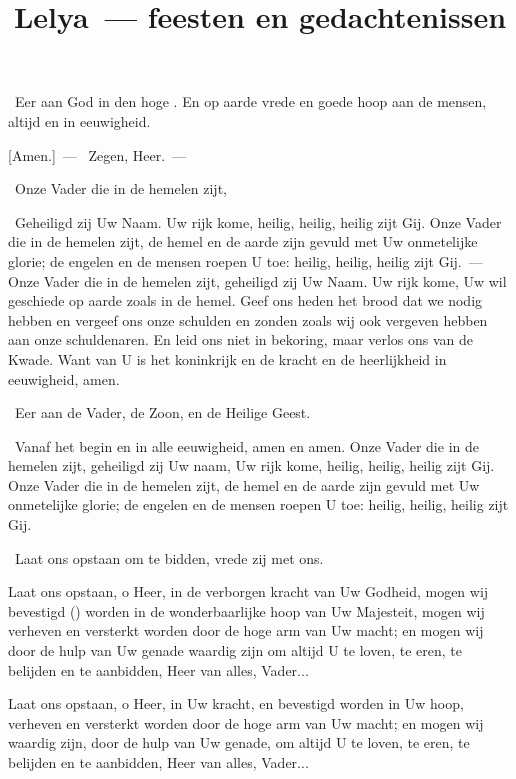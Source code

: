 \documentclass[12pt,twoside,a5paper]{article}
\begin{document}
\title{Lelya~--- feesten en gedachtenissen}
\author{}
\date{}
\maketitle

\footnotelayout{\ }


\begin{halfparskip}
  \cc~Eer aan God in den hoge . En op aarde vrede en goede hoop aan de mensen, altijd en in eeuwigheid.

  [Amen.]~--- \rr~Zegen, Heer.~--- \liturgicalhint{[Vredekus.]}

  \cc~Onze Vader die in de hemelen zijt,

  \rr~Geheiligd zij Uw Naam. Uw rijk kome, heilig, heilig, heilig zijt Gij. Onze Vader die in de hemelen zijt, de hemel en de aarde zijn gevuld met Uw onmetelijke glorie; de engelen en de mensen roepen U toe: heilig, heilig, heilig zijt Gij.~--- Onze Vader die in de hemelen zijt, geheiligd zij Uw Naam. Uw rijk kome, Uw wil geschiede op aarde zoals in de hemel. Geef ons heden het brood dat we nodig hebben en vergeef ons onze schulden en zonden zoals wij ook vergeven hebben aan onze schuldenaren. En leid ons niet in bekoring, maar verlos ons van de Kwade. Want van U is het koninkrijk en de kracht en de heerlijkheid in eeuwigheid, amen.

  \cc~Eer aan de Vader, de Zoon, en de Heilige Geest.

  \rr~Vanaf het begin en in alle eeuwigheid, amen en amen. Onze Vader die in de hemelen zijt, geheiligd zij Uw naam, Uw rijk kome, heilig, heilig, heilig zijt Gij. Onze Vader die in de hemelen zijt, de hemel en de aarde zijn gevuld met Uw onmetelijke glorie; de engelen en de mensen roepen U toe: heilig, heilig, heilig zijt Gij.

  \dd~Laat ons opstaan om te bidden, vrede zij met ons.

   Laat ons opstaan, o Heer, in de verborgen kracht van Uw Godheid, mogen wij bevestigd () worden in de wonderbaarlijke hoop van Uw Majesteit, mogen wij verheven en versterkt worden door de hoge arm van Uw macht; en mogen wij door de hulp van Uw genade waardig zijn om altijd U te loven, te eren, te belijden en te aanbidden, Heer van alles, Vader...

   Laat ons opstaan, o Heer, in Uw kracht, en bevestigd worden in Uw hoop, verheven en versterkt worden door de hoge arm van Uw macht; en mogen wij waardig zijn, door de hulp van Uw genade, om altijd U te loven, te eren, te belijden en te aanbidden, Heer van alles, Vader...

\end{halfparskip}
\end{document}
